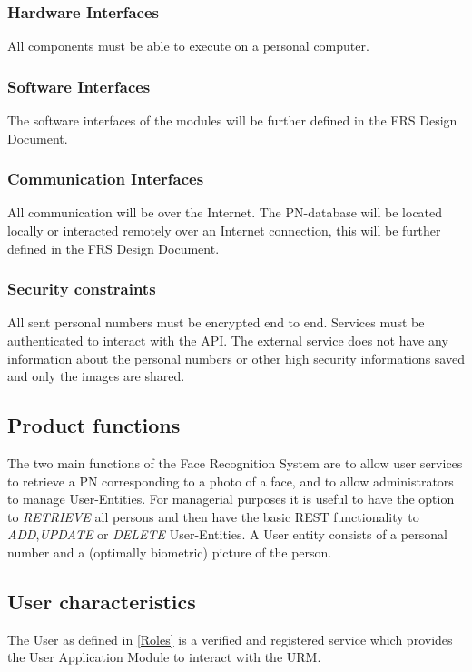 \documentclass[a4paper,11pt]{article}
\begin{document}
\subsubsection{Hardware Interfaces}
All components must be able to execute on a personal computer.

\subsubsection{Software Interfaces}
The software interfaces of the modules will be further defined in the FRS Design Document.

\subsubsection{Communication Interfaces}
All communication will be over the Internet.
The PN-database will be located locally or interacted remotely over an Internet connection, this will be further defined in the FRS Design Document.

\subsubsection{Security constraints}
All sent personal numbers must be encrypted end to end. Services must be authenticated to interact with the API. The external service does not have any information about the personal numbers or other high security informations saved and only the images are shared.

\subsection{Product functions}
The two main functions of the Face Recognition System are to allow user services to retrieve a PN corresponding to a photo of a face, and to allow administrators to manage User-Entities.
\newline
\noindent
For managerial purposes it is useful to have the option to \textit{RETRIEVE} all persons and then have the basic REST functionality to \textit{ADD},\textit{UPDATE} or \textit{DELETE} User-Entities. A User entity consists of a personal number and a (optimally biometric) picture of the person.

\subsection{User characteristics}
The User as defined in \ref{Roles} is a verified and registered service which provides the User Application Module to interact with the URM.
\end{document}
